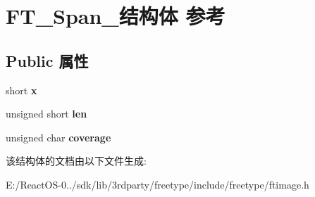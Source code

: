 \hypertarget{struct_f_t___span__}{}\section{F\+T\+\_\+\+Span\+\_\+结构体 参考}
\label{struct_f_t___span__}
\subsection*{Public 属性}
\begin{DoxyCompactItemize}
\item 
\mbox{\label{struct_f_t___span___a7f7235a404c66398b49c50fa09691ba5}} 
short {\bfseries x}
\item 
\mbox{\label{struct_f_t___span___a939c84317f25a97d0ba01704591a4d38}} 
unsigned short {\bfseries len}
\item 
\mbox{\label{struct_f_t___span___a70f9c9e0e8d3f0b38adee03a508ae214}} 
unsigned char {\bfseries coverage}
\end{DoxyCompactItemize}


该结构体的文档由以下文件生成\+:\begin{DoxyCompactItemize}
\item 
E\+:/\+React\+O\+S-\/0../sdk/lib/3rdparty/freetype/include/freetype/ftimage.\+h\end{DoxyCompactItemize}
